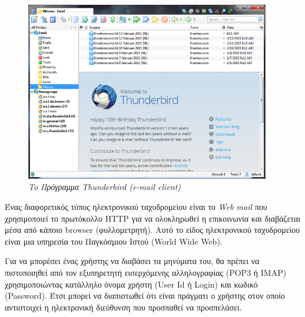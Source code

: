 \begin{figure}[!ht]
 \centering
 \includegraphics[width=0.95\textwidth]{images/chapter6/6-7}
 \caption {\textsl{To Πρόγραμμα Thunderbird (e-mail client)}}
 \label{6-7}
\end{figure}

Ένας διαφορετικός τύπος ηλεκτρονικού ταχυδρομείου είναι το \emph{Web mail} που χρησιμοποιεί το πρωτόκολλο HTTP για να ολοκληρωθεί η επικοινωνία και διαβάζεται μέσα από κάποιο browser (φυλλομετρητή). Αυτό το είδος ηλεκτρονικού ταχυδρομείου είναι μια υπηρεσία του Παγκόσμιου Ιστού (World Wide Web). 

Για να μπορέσει ένας χρήστης να διαβάσει τα μηνύματα του, θα πρέπει να πιστοποιηθεί από τον εξυπηρετητή εισερχόμενης αλληλογραφίας (POP3 ή IMAP) χρησιμοποιώντας κατάλληλο όνομα χρήστη (User Id ή Login) και κωδικό (Password). Έτσι μπορεί να διαπιστωθεί ότι είναι πράγματι ο χρήστης στον οποίο αντιστοιχεί η ηλεκτρονική διεύθυνση που προσπαθεί να προσπελάσει.